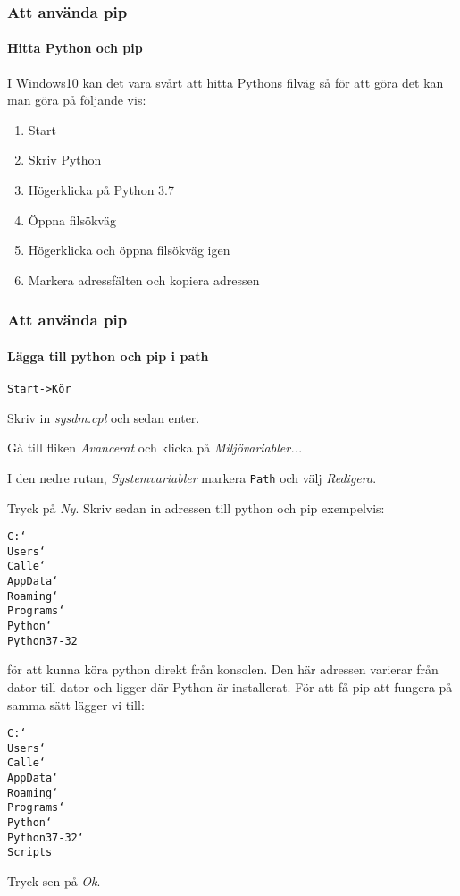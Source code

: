 \documentclass{beamer}
\begin{document}
\begin{frame}
\frametitle{Att använda pip}
\framesubtitle{Hitta Python och pip}

I Windows10 kan det vara svårt att hitta Pythons filväg så för att göra det kan man göra på följande vis:

\begin{enumerate}
\item Start
\item Skriv Python
\item Högerklicka på Python 3.7
\item Öppna filsökväg
\item Högerklicka och öppna filsökväg igen
\item Markera adressfälten och kopiera adressen
\end{enumerate}

\end{frame}

\begin{frame}
\frametitle{Att använda pip}
\framesubtitle{Lägga till python och pip i path}

\texttt{Start->Kör}

Skriv in \textit{sysdm.cpl} och sedan enter. \pause

Gå till fliken \textit{Avancerat} och klicka på \textit{Miljövariabler...}

I den nedre rutan, \textit{Systemvariabler} markera \texttt{Path} och välj \textit{Redigera}. \pause

Tryck på \textit{Ny}. Skriv sedan in adressen till python och pip exempelvis:

\texttt{C:\char`\\Users\char`\\Calle\char`\\AppData\char`\\Roaming\char`\\Programs\char`\\}
\texttt{Python\char`\\Python37-32}

för att kunna köra python direkt från konsolen. \pause Den här adressen varierar från dator till dator och ligger där Python är installerat. För att få pip att fungera på samma sätt lägger vi till:

\texttt{C:\char`\\Users\char`\\Calle\char`\\AppData\char`\\Roaming\char`\\Programs\char`\\}
\texttt{Python\char`\\Python37-32\char`\\Scripts}

Tryck sen på \textit{Ok}.

\end{frame}
\end{document}
